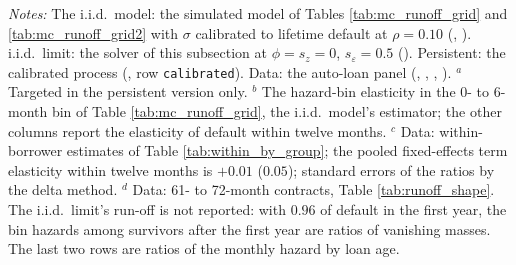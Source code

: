 \begin{table}[H]
\centering
\caption{The stopping model with i.i.d.\ and with persistent income: parameters, targeted and untargeted moments, and the data}
\label{tab:persistent_calibration}
\small
\resizebox{0.95\textwidth}{!}{}
\vspace{0.5em}
\begin{minipage}{0.95\textwidth}
\noindent \small \textit{Notes:} The i.i.d.\ model: the simulated model of Tables \ref{tab:mc_runoff_grid} and \ref{tab:mc_runoff_grid2} with $\sigma$ calibrated to lifetime default at $\rho = 0.10$ (, ). i.i.d.\ limit: the solver of this subsection at $\phi = s_z = 0$, $s_\varepsilon = 0.5$ (). Persistent: the calibrated process (, row \texttt{calibrated}). Data: the auto-loan panel (, , , ). $^{a}$ Targeted in the persistent version only. $^{b}$ The hazard-bin elasticity in the 0- to 6-month bin of Table \ref{tab:mc_runoff_grid}, the i.i.d.\ model's estimator; the other columns report the elasticity of default within twelve months. $^{c}$ Data: within-borrower estimates of Table \ref{tab:within_by_group}; the pooled fixed-effects term elasticity within twelve months is $+0.01$ ($0.05$); standard errors of the ratios by the delta method. $^{d}$ Data: 61- to 72-month contracts, Table \ref{tab:runoff_shape}. The i.i.d.\ limit's run-off is not reported: with $0.96$ of default in the first year, the bin hazards among survivors after the first year are ratios of vanishing masses. The last two rows are ratios of the monthly hazard by loan age.
\end{minipage}
\end{table}

